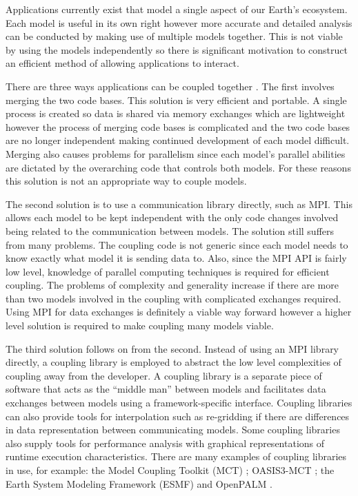 Applications currently exist that model a single aspect of our Earth's
ecosystem. Each model is useful in its own right however more accurate and
detailed analysis can be conducted by making use of multiple models together.
This is not viable by using the models independently so there is significant
motivation to construct an efficient method of allowing applications to
interact.

There are three ways applications can be coupled together \cite{Thevenin}. The
first involves merging the two code bases. This solution is very efficient and
portable. A single process is created so data is shared via memory exchanges
which are lightweight however the process of merging code bases is complicated
and the two code bases are no longer independent making continued development of
each model difficult. Merging also causes problems for parallelism since each
model's parallel abilities are dictated by the overarching code that controls
both models. For these reasons this solution is not an appropriate way to couple
models.

The second solution \cite{Thevenin} is to use a communication library directly,
such as MPI. This allows each model to be kept independent with the only code
changes involved being related to the communication between models. The solution
still suffers from many problems. The coupling code is not generic since each
model needs to know exactly what model it is sending data to. Also, since the
MPI API is fairly low level, knowledge of parallel computing techniques is
required for efficient coupling. The problems of complexity and generality
increase if there are more than two models involved in the coupling with
complicated exchanges required. Using MPI for data exchanges is definitely a
viable way forward however a higher level solution is required to make coupling
many models viable.

The third solution \cite{Thevenin} follows on from the second. Instead of using
an MPI library directly, a coupling library is employed to abstract the low
level complexities of coupling away from the developer. A coupling library is a
separate piece of software that acts as the ``middle man'' between models and
facilitates data exchanges between models using a framework-specific interface.
Coupling libraries can also provide tools for interpolation such as re-gridding
\cite{Kuinghttons} if there are differences in data representation between
communicating models. Some coupling libraries also supply tools for performance
analysis with graphical representations of runtime execution characteristics.
There are many examples of coupling libraries in use, for example: the Model
Coupling Toolkit (MCT) \cite{Larson2005,Jacob2005}; OASIS3-MCT
\cite{Valcke,Valcke2013}; the Earth System Modeling Framework (ESMF)
\cite{Ramework2004} and OpenPALM \cite{Piacentini2011}.


